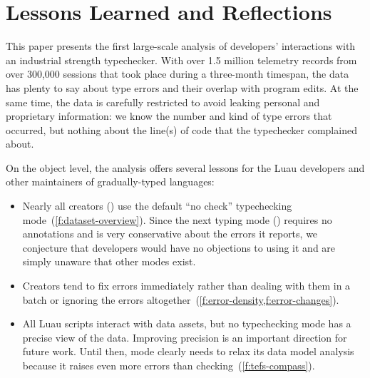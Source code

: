 \documentclass[english,submission,cleveref]{programming}
\begin{document}


\section{Lessons Learned and Reflections}
\label{s:conclusion}

This paper presents the first large-scale analysis of developers' interactions with
an industrial strength typechecker.
With over 1.5 million telemetry records from over 300,000 sessions
that took place during a three-month timespan, the data has plenty to say about
type errors and their overlap with program edits.
At the same time, the data is carefully restricted to avoid leaking personal
and proprietary information: we know the number and kind of type errors
that occurred, but nothing about the line(s) of code that the typechecker
complained about.

On the object level, the analysis offers several lessons for the Luau
developers and other maintainers of gradually-typed languages:
\begin{itemize}
  \item
    Nearly all creators () use the default ``no check''
    typechecking mode~(\cref{f:dataset-overview}).
    Since the next typing mode (\mnonstrict{}) requires no annotations and is
    very conservative about the errors it reports, we conjecture that
    developers would have no objections to using it and are simply unaware that
    other modes exist.
  \item
    Creators tend to fix errors immediately rather than dealing with them in a batch
    or ignoring the errors altogether~(\cref{f:error-density,f:error-changes}).
  \item
    All Luau scripts interact with data assets, but no typechecking mode
    has a precise view of the data.
    Improving precision is an important direction for future work.
    Until then, \mstrict{} mode clearly needs to relax its data model
    analysis because it raises even more errors than \FS{} checking~(\cref{f:tefs-compass}).
\end{itemize}
\end{document}
